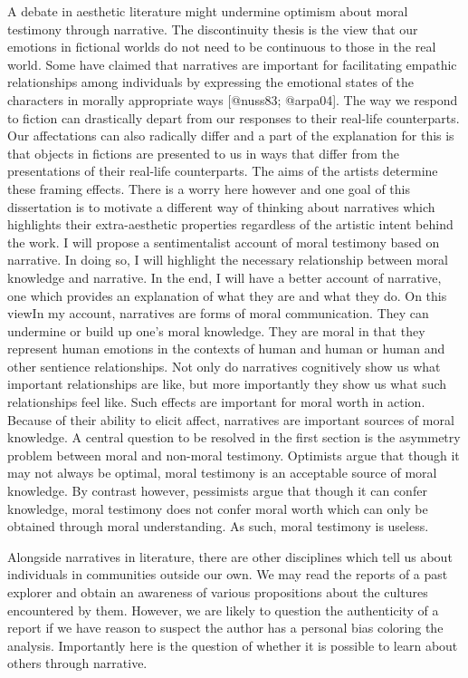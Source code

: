 \documentclass[
  letterpaper,
  DIV=11,
  numbers=noendperiod]{scrartcl}
\theoremstyle{remark}
\begin{document}
A debate in aesthetic literature might undermine optimism about moral
testimony through narrative. The discontinuity thesis is the view that
our emotions in fictional worlds do not need to be continuous to those
in the real world. Some have claimed that narratives are important for
facilitating empathic relationships among individuals by expressing the
emotional states of the characters in morally appropriate ways
{[}@nuss83; @arpa04{]}. The way we respond to fiction can drastically
depart from our responses to their real-life counterparts. Our
affectations can also radically differ and a part of the explanation for
this is that objects in fictions are presented to us in ways that differ
from the presentations of their real-life counterparts. The aims of the
artists determine these framing effects. There is a worry here however
and one goal of this dissertation is to motivate a different way of
thinking about narratives which highlights their extra-aesthetic
properties regardless of the artistic intent behind the work. I will
propose a sentimentalist account of moral testimony based on narrative.
In doing so, I will highlight the necessary relationship between moral
knowledge and narrative. In the end, I will have a better account of
narrative, one which provides an explanation of what they are and what
they do. On this viewIn my account, narratives are forms of moral
communication. They can undermine or build up one's moral knowledge.
They are moral in that they represent human emotions in the contexts of
human and human or human and other sentience relationships. Not only do
narratives cognitively show us what important relationships are like,
but more importantly they show us what such relationships feel like.
Such effects are important for moral worth in action. Because of their
ability to elicit affect, narratives are important sources of moral
knowledge. A central question to be resolved in the first section is the
asymmetry problem between moral and non-moral testimony. Optimists argue
that though it may not always be optimal, moral testimony is an
acceptable source of moral knowledge. By contrast however, pessimists
argue that though it can confer knowledge, moral testimony does not
confer moral worth which can only be obtained through moral
understanding. As such, moral testimony is useless.

Alongside narratives in literature, there are other disciplines which
tell us about individuals in communities outside our own. We may read
the reports of a past explorer and obtain an awareness of various
propositions about the cultures encountered by them. However, we are
likely to question the authenticity of a report if we have reason to
suspect the author has a personal bias coloring the analysis.
Importantly here is the question of whether it is possible to learn
about others through narrative.
\end{document}
